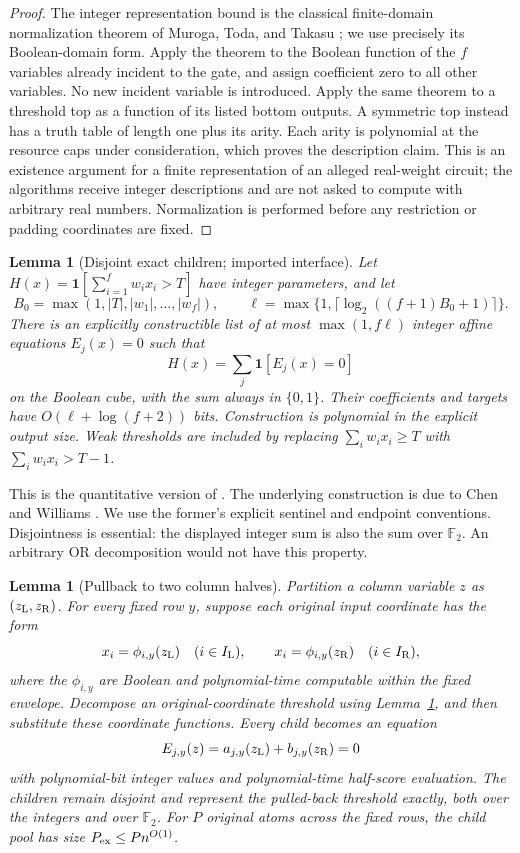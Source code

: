 \documentclass[11pt,letterpaper]{article}
\newtheorem{lemma}[theorem]{Lemma}
\theoremstyle{definition}
\theoremstyle{remark}
\newcommand{\ind}{\mathbf 1}
\begin{document}
\begin{proof}
The integer representation bound is the classical finite-domain
normalization theorem of Muroga, Toda, and Takasu
\cite{MurogaTodaTakasu}; we use precisely its Boolean-domain form.
Apply the theorem to the Boolean function of the $f$ variables already
incident to the gate, and assign coefficient zero to all other variables.
No new incident variable is introduced.  Apply the same theorem to a
threshold top as a function of its listed bottom outputs.  A symmetric
top instead has a truth table of length one plus its arity.  Each arity is
polynomial at the resource caps under consideration, which proves the
description claim.  This is an existence argument for a finite
representation of an alleged real-weight circuit; the algorithms receive
integer descriptions and are not asked to compute with arbitrary real
numbers.  Normalization is performed before any restriction or padding
coordinates are fixed.
\end{proof}

\begin{lemma}[Disjoint exact children; imported interface]
\label{alg:disjoint}
Let $H(x)=\ind[\sum_{i=1}^f w_i x_i>T]$ have integer parameters,
and let
\[
 B_0=\max(1,|T|,|w_1|,\ldots,|w_f|),\qquad
 \ell=\max\{1,\lceil\log_2((f+1)B_0+1)\rceil\}.
\]
There is an explicitly constructible list of at most $\max(1,f\ell)$
integer affine equations $E_j(x)=0$ such that
\[
 H(x)=\sum_j\ind[E_j(x)=0]
\]
on the Boolean cube, with the sum always in $\{0,1\}$.  Their coefficients
and targets have $O(\ell+\log(f+2))$ bits.  Construction is polynomial in
the explicit output size.  Weak thresholds are included by replacing
$\sum_iw_ix_i\ge T$ with $\sum_iw_ix_i>T-1$.
\end{lemma}

This is the quantitative version of
\cite[Lemma~A.4]{NagCubic}.  The underlying construction is due to
Chen and Williams \cite[Proposition~18(2) and Appendix~B,
Lemmas~48--49]{ChenWilliams}.  We use the former's explicit sentinel and
endpoint conventions.  Disjointness is essential: the displayed integer
sum is also the sum over $\mathbb F_2$.  An arbitrary OR decomposition
would not have this property.

\begin{lemma}[Pullback to two column halves]
\label{alg:pullback}
Partition a column variable $z$ as $(z_{\rm L},z_{\rm R})$.  For every fixed
row $y$, suppose each original input coordinate has the form
\[
 x_i=\phi_{i,y}(z_{\rm L})\quad(i\in I_{\rm L}),\qquad
 x_i=\phi_{i,y}(z_{\rm R})\quad(i\in I_{\rm R}),
\]
where the $\phi_{i,y}$ are Boolean and polynomial-time computable within
the fixed envelope.  Decompose an original-coordinate threshold using
Lemma~\ref{alg:disjoint}, and then substitute these coordinate functions.
Every child becomes an equation
\[
 E_{j,y}(z)=a_{j,y}(z_{\rm L})+b_{j,y}(z_{\rm R})=0
\]
with polynomial-bit integer values and polynomial-time half-score
evaluation.  The children remain disjoint and represent the pulled-back
threshold exactly, both over the integers and over $\mathbb F_2$.
For $P$ original atoms across the fixed rows, the child pool has size
$P_{\rm ex}\le P n^{O(1)}$.
\end{lemma}
\end{document}
